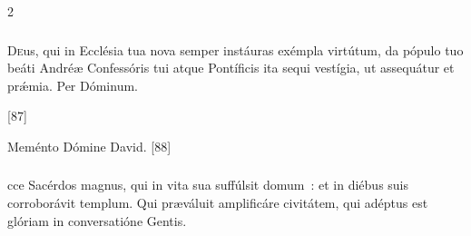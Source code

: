 \documentclass[9pt,twoside]{extarticle}
\begin{document}
\begin{multicols}{2}
{{{\subsubsection*{\center {}}
\lettrine{D}eus, qui in Ecclésia tua nova semper instáuras exémpla virtútum, da pópulo tuo beáti Andréæ Confessóris tui atque Pontíficis ita sequi vestígia, ut assequátur et prǽmia. Per Dóminum.

\begin{tightlist}{}
\item {} [87]
\item {} Meménto Dómine David. [88]
\end{tightlist}

\subsubsection*{}
cce Sacérdos magnus, qui in vita sua suffúlsit domum~: et in diébus suis corroborávit templum. Qui præváluit amplificáre civitátem, qui adéptus est glóriam in conversatióne Gentis.

}}}
\end{multicols}
\end{document}
